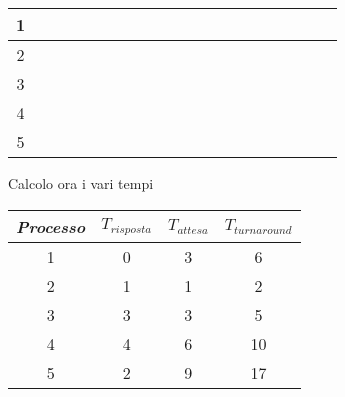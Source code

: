 \documentclass{article}
\begin{document}
\begin{itemize}
\begin{center}
\begin{tabular}{|c|c|c|c|c|c|c|c|c|c|c|c|c|c|c|c|c|c|c|c|}
                \hline
                1 & \cellcolor{red!25} & \cellcolor{red!25} & & & &  \cellcolor{red!25} & & &  & & & & & & & & &\\
                \hline
                2 & & & \cellcolor{red!25} & & & & & & & & & & & & & & & \\
                \hline
                3 & & & & & & & \cellcolor{red!25} & \cellcolor{red!25} & & & & & & & & & & \\
                \hline
                4 & & & & & & & & & \cellcolor{red!25} & \cellcolor{red!25} & & & \cellcolor{red!25} & \cellcolor{red!25} & & & & \\
                \hline
                5 & & & & \cellcolor{red!25} & \cellcolor{red!25} & & & & & & \cellcolor{red!25} & \cellcolor{red!25} & & & \cellcolor{red!25} & \cellcolor{red!25} & \cellcolor{red!25} & \cellcolor{red!25}\\
                \hline
            \end{tabular}
         \end{center}
         Calcolo ora i vari tempi
         \begin{center}
            \begin{tabular}{|c|c|c|c|}
               \hline
               \emph{Processo} & $T_{risposta}$ & $T_{attesa}$ & $T_{turnaround}$\\
               \hline
               1 & 0 & 3 & 6\\
               \hline
               2 & 1 & 1 & 2\\
               \hline
               3 & 3 & 3 & 5\\
               \hline
               4 & 4 & 6 & 10\\
               \hline
               5 & 2 & 9 & 17\\
               \hline
            \end{tabular}
         \end{center}
   \end{itemize}
\end{document}
